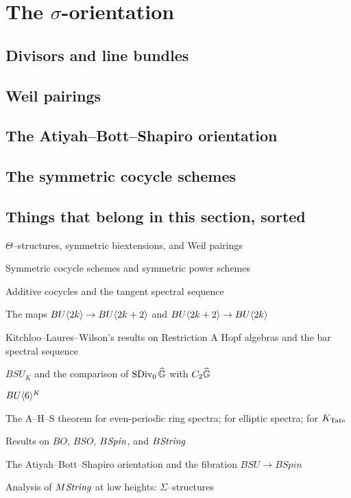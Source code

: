 
\chapter{The $\sigma$-orientation}





\section{Divisors and line bundles}

\section{Weil pairings}

\section{The Atiyah--Bott--Shapiro orientation}

\section{The symmetric cocycle schemes}



\section*{Things that belong in this section, sorted}

$\Theta$--structures, symmetric biextensions, and Weil pairings

Symmetric cocycle schemes and symmetric power schemes

Additive cocycles and the tangent spectral sequence

The maps $BU\langle2k\rangle \to BU\langle2k+2\rangle$ and $BU\langle2k+2\rangle \to BU\langle2k\rangle$

Kitchloo--Laures--Wilson's results on Restriction A Hopf algebras and the bar spectral sequence

$BSU_K$  and the comparison of $\operatorname{SDiv}_0 \widehat{\mathbb G}$ with $C_2 \widehat{\mathbb G}$ 

$BU\langle6\rangle^K$ 

The A--H--S theorem for even-periodic ring spectra; for elliptic spectra; for $K_{\mathrm{Tate}}$

Results on $BO$, $BSO$, $B\mathit{Spin}$, and $B\mathit{String}$

The Atiyah--Bott--Shapiro orientation and the fibration $BSU \to BSpin$ 

Analysis of $M\mathit{String}$ at low heights: $\Sigma$--structures
